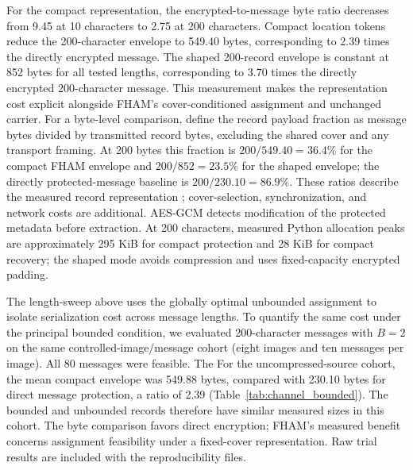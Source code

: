 \documentclass[preprint,12pt]{elsarticle}
\theoremstyle{plain}
\providecommand{\DIFaddtex}[1]{{\protect\color{blue} \sf #1}} %
\providecommand{\DIFdeltex}[1]{{\protect\color{red} \scriptsize #1}} %
\providecommand{\DIFaddbegin}{} %
\providecommand{\DIFaddend}{} %
\providecommand{\DIFdelbegin}{} %
\providecommand{\DIFdelend}{} %
\providecommand{\DIFadd}[1]{\texorpdfstring{\DIFaddtex{#1}}{#1}} %
\providecommand{\DIFdel}[1]{\texorpdfstring{\DIFdeltex{#1}}{}} %
\providecommand{\DIFscaledelfig}{0.5}
\newlength{\DIFdelgraphicswidth} %
\newlength{\DIFdelgraphicsheight} %
\providecommand{\DIFaddincludegraphics}[2][]{{\color{blue}\fbox{\DIFOincludegraphics[#1]{#2}}}} %
\providecommand{\DIFdelincludegraphics}[2][]{%
\sbox{\DIFdelgraphicsbox}{\DIFOincludegraphics[#1]{#2}}%
\settoboxwidth{\DIFdelgraphicswidth}{\DIFdelgraphicsbox} %
\settoboxtotalheight{\DIFdelgraphicsheight}{\DIFdelgraphicsbox} %
\scalebox{\DIFscaledelfig}{%
\parbox[b]{\DIFdelgraphicswidth}{\usebox{\DIFdelgraphicsbox}\\[-\baselineskip] \rule{\DIFdelgraphicswidth}{0em}}\llap{\resizebox{\DIFdelgraphicswidth}{\DIFdelgraphicsheight}{%
\setlength{\unitlength}{\DIFdelgraphicswidth}%
\begin{picture}(1,1)%
\thicklines\linethickness{2pt} %
{\color[rgb]{1,0,0}\put(0,0){\framebox(1,1){}}}%
{\color[rgb]{1,0,0}\put(0,0){\line( 1,1){1}}}%
{\color[rgb]{1,0,0}\put(0,1){\line(1,-1){1}}}%
\end{picture}%
}\hspace*{3pt}}} %
} %
\DeclareRobustCommand{\DIFaddbegin}{\DIFOaddbegin \let\includegraphics\DIFaddincludegraphics} %
\DeclareRobustCommand{\DIFaddend}{\DIFOaddend \let\includegraphics\DIFOincludegraphics} %
\DeclareRobustCommand{\DIFdelbegin}{\DIFOdelbegin \let\includegraphics\DIFdelincludegraphics} %
\DeclareRobustCommand{\DIFdelend}{\DIFOaddend \let\includegraphics\DIFOincludegraphics} %
\renewcommand{\DIFdel}[1]{}
\renewcommand{\DIFdelincludegraphics}[2][]{}
\begin{document}
For the compact representation, the encrypted-to-message byte ratio decreases
from 9.45 at 10 characters to 2.75 at 200 characters. Compact location tokens
reduce the 200-character envelope to 549.40 bytes, corresponding to 2.39 times
the directly encrypted message. The shaped 200-record envelope is constant at
852 bytes for all tested lengths, corresponding to 3.70 times the directly
encrypted 200-character message. This measurement makes the representation
cost explicit alongside FHAM's cover-conditioned assignment and unchanged
carrier. For a byte-level comparison, define the record payload fraction as
message bytes divided by transmitted record bytes, excluding the shared cover
and any transport framing. At 200 bytes this fraction is $200/549.40=36.4\%$
for the compact FHAM envelope and $200/852=23.5\%$ for the shaped envelope;
the directly protected-message baseline is $200/230.10=86.9\%$. These ratios
describe \DIFdelbegin \DIFdel{only }\DIFdelend the measured record representation\DIFdelbegin \DIFdel{and do not account for
}\DIFdelend \DIFaddbegin \DIFadd{; }\DIFaddend cover-selection, synchronization,
\DIFdelbegin \DIFdel{or network costs }\DIFdelend \DIFaddbegin \DIFadd{and network costs are additional}\DIFaddend . AES-GCM detects
modification of the protected metadata before extraction. At 200 characters,
measured Python allocation peaks are
approximately 295 KiB for compact protection and 28 KiB for compact recovery;
the shaped mode avoids compression and uses fixed-capacity encrypted padding.

The length-sweep above uses the globally optimal unbounded assignment to
isolate serialization cost across message lengths. To quantify the same cost
under the principal bounded condition, we evaluated 200-character messages
with $B=2$ on the same controlled-image/message cohort
(eight images and ten messages per image). All 80 messages were feasible. The
\DIFdelbegin \DIFdel{Without pre-assignment source compression}\DIFdelend \DIFaddbegin \DIFadd{For the uncompressed-source cohort}\DIFaddend , the mean compact envelope was 549.88 bytes, compared with 230.10 bytes for direct
message protection, a ratio of 2.39 (Table~\ref{tab:channel_bounded}). The
bounded and unbounded records therefore have similar measured sizes in this
cohort. \DIFdelbegin \DIFdel{Direct encryption uses fewer bytes in this comparison }\DIFdelend \DIFaddbegin \DIFadd{The byte comparison favors direct encryption}\DIFaddend ; FHAM's measured benefit
concerns assignment feasibility under a fixed-cover representation\DIFdelbegin \DIFdel{,
not communication volume}\DIFdelend . Raw trial results are included with the
reproducibility files.
\end{document}
